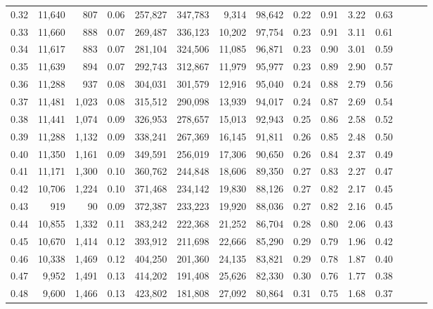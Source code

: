 \begin{tabular}{rrrrrrrrrrrrrrr}
0.32 &  11,640 &    807 &  0.06 &  257,827 &  347,783 &    9,314 &   98,642 &  0.22 &  0.91 &  3.22 &      0.63 \\
0.33 &  11,660 &    888 &  0.07 &  269,487 &  336,123 &   10,202 &   97,754 &  0.23 &  0.91 &  3.11 &      0.61 \\
0.34 &  11,617 &    883 &  0.07 &  281,104 &  324,506 &   11,085 &   96,871 &  0.23 &  0.90 &  3.01 &      0.59 \\
0.35 &  11,639 &    894 &  0.07 &  292,743 &  312,867 &   11,979 &   95,977 &  0.23 &  0.89 &  2.90 &      0.57 \\
0.36 &  11,288 &    937 &  0.08 &  304,031 &  301,579 &   12,916 &   95,040 &  0.24 &  0.88 &  2.79 &      0.56 \\
0.37 &  11,481 &  1,023 &  0.08 &  315,512 &  290,098 &   13,939 &   94,017 &  0.24 &  0.87 &  2.69 &      0.54 \\
0.38 &  11,441 &  1,074 &  0.09 &  326,953 &  278,657 &   15,013 &   92,943 &  0.25 &  0.86 &  2.58 &      0.52 \\
0.39 &  11,288 &  1,132 &  0.09 &  338,241 &  267,369 &   16,145 &   91,811 &  0.26 &  0.85 &  2.48 &      0.50 \\
0.40 &  11,350 &  1,161 &  0.09 &  349,591 &  256,019 &   17,306 &   90,650 &  0.26 &  0.84 &  2.37 &      0.49 \\
0.41 &  11,171 &  1,300 &  0.10 &  360,762 &  244,848 &   18,606 &   89,350 &  0.27 &  0.83 &  2.27 &      0.47 \\
0.42 &  10,706 &  1,224 &  0.10 &  371,468 &  234,142 &   19,830 &   88,126 &  0.27 &  0.82 &  2.17 &      0.45 \\
0.43 &     919 &     90 &  0.09 &  372,387 &  233,223 &   19,920 &   88,036 &  0.27 &  0.82 &  2.16 &      0.45 \\
0.44 &  10,855 &  1,332 &  0.11 &  383,242 &  222,368 &   21,252 &   86,704 &  0.28 &  0.80 &  2.06 &      0.43 \\
0.45 &  10,670 &  1,414 &  0.12 &  393,912 &  211,698 &   22,666 &   85,290 &  0.29 &  0.79 &  1.96 &      0.42 \\
0.46 &  10,338 &  1,469 &  0.12 &  404,250 &  201,360 &   24,135 &   83,821 &  0.29 &  0.78 &  1.87 &      0.40 \\
0.47 &   9,952 &  1,491 &  0.13 &  414,202 &  191,408 &   25,626 &   82,330 &  0.30 &  0.76 &  1.77 &      0.38 \\
0.48 &   9,600 &  1,466 &  0.13 &  423,802 &  181,808 &   27,092 &   80,864 &  0.31 &  0.75 &  1.68 &      0.37 \\

\end{tabular}
